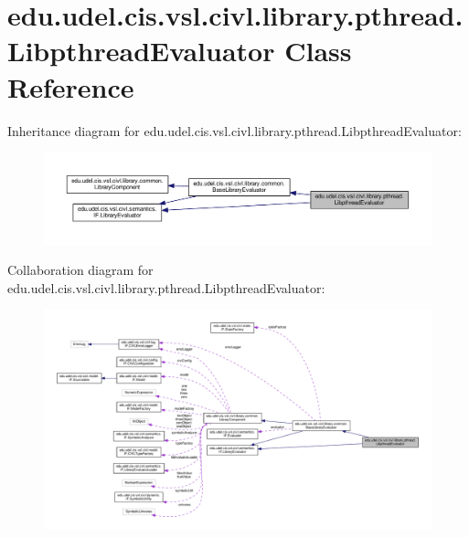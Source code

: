 \hypertarget{classedu_1_1udel_1_1cis_1_1vsl_1_1civl_1_1library_1_1pthread_1_1LibpthreadEvaluator}{}\section{edu.\+udel.\+cis.\+vsl.\+civl.\+library.\+pthread.\+Libpthread\+Evaluator Class Reference}
\label{classedu_1_1udel_1_1cis_1_1vsl_1_1civl_1_1library_1_1pthread_1_1LibpthreadEvaluator}


Inheritance diagram for edu.\+udel.\+cis.\+vsl.\+civl.\+library.\+pthread.\+Libpthread\+Evaluator\+:
\nopagebreak
\begin{figure}[H]
\begin{center}
\leavevmode
\includegraphics[width=350pt]{classedu_1_1udel_1_1cis_1_1vsl_1_1civl_1_1library_1_1pthread_1_1LibpthreadEvaluator__inherit__graph}
\end{center}
\end{figure}


Collaboration diagram for edu.\+udel.\+cis.\+vsl.\+civl.\+library.\+pthread.\+Libpthread\+Evaluator\+:
\nopagebreak
\begin{figure}[H]
\begin{center}
\leavevmode
\includegraphics[width=350pt]{classedu_1_1udel_1_1cis_1_1vsl_1_1civl_1_1library_1_1pthread_1_1LibpthreadEvaluator__coll__graph}
\end{center}
\end{figure}
